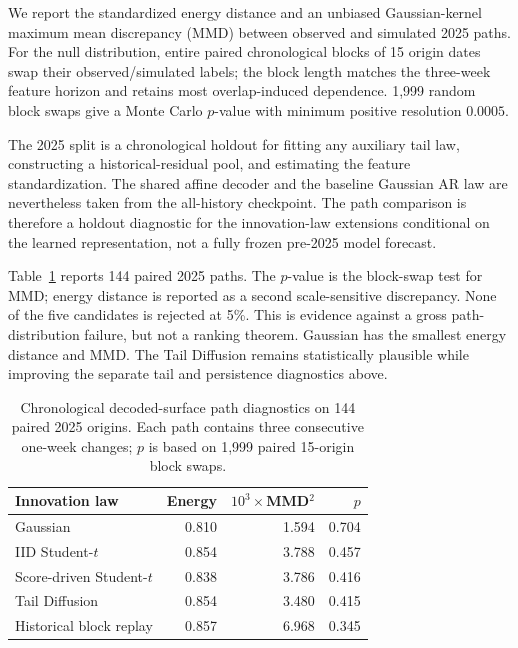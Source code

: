 \documentclass[11pt,a4paper]{article}
\begin{document}
We report the standardized energy distance and an unbiased Gaussian-kernel
maximum mean discrepancy (MMD) between observed and simulated 2025 paths.
For the null distribution, entire paired chronological blocks of 15 origin
dates swap their observed/simulated labels; the block length matches the
three-week feature horizon and retains most overlap-induced dependence.
1,999 random block swaps give a Monte Carlo $p$-value with minimum positive
resolution $0.0005$.

The 2025 split is a chronological holdout for fitting any auxiliary tail law,
constructing a historical-residual pool, and estimating the feature
standardization.  The shared affine decoder and the baseline Gaussian AR law
are nevertheless taken from the all-history checkpoint.  The path comparison
is therefore a holdout diagnostic for the innovation-law extensions
conditional on the learned representation, not a fully frozen pre-2025 model
forecast.

Table~\ref{tab:path-realism} reports 144 paired 2025 paths.
The $p$-value is the block-swap test for MMD; energy distance is reported as a
second scale-sensitive discrepancy.  None of the five candidates is rejected
at 5\%.  This is evidence against a gross path-distribution failure, but not a
ranking theorem.  Gaussian has the smallest energy distance and MMD.  The
Tail Diffusion remains statistically plausible while improving the
separate tail and persistence diagnostics above.

\begin{table}[H]
\centering
\small
\begin{tabular}{lrrr}
\toprule
Innovation law & Energy & $10^3\!\times$MMD$^2$ & $p$\\
\midrule
Gaussian & 0.810 & 1.594 & 0.704\\
IID Student-$t$ & 0.854 & 3.788 & 0.457\\
Score-driven Student-$t$ & 0.838 & 3.786 & 0.416\\
Tail Diffusion & 0.854 & 3.480 & 0.415\\
Historical block replay & 0.857 & 6.968 & 0.345\\
\bottomrule
\end{tabular}
\caption{Chronological decoded-surface path diagnostics on 144 paired 2025
origins.  Each path contains three consecutive one-week changes; $p$ is based
on 1,999 paired 15-origin block swaps.}
\label{tab:path-realism}
\end{table}
\end{document}
